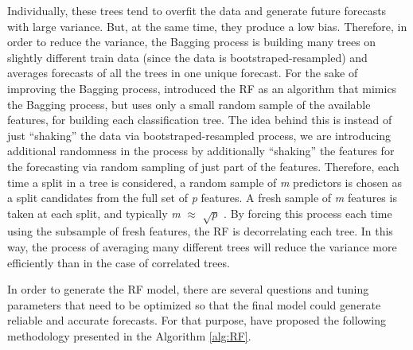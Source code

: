 \documentclass[preprint, 3p,
authoryear]{elsarticle} %
\begin{document}
Individually, these trees tend to overfit the data and generate future
forecasts with large variance. But, at the same time, they produce a low
bias. Therefore, in order to reduce the variance, the Bagging process is
building many trees on slightly different train data (since the data is
bootstraped-resampled) and averages forecasts of all the trees in one
unique forecast. For the sake of improving the Bagging process,
\citet{breiman2001random} introduced the RF as an algorithm that mimics
the Bagging process, but uses only a small random sample of the
available features, for building each classification tree. The idea
behind this is instead of just ``shaking'' the data via
bootstraped-resampled process, we are introducing additional randomness
in the process by additionally ``shaking'' the features for the
forecasting via random sampling of just part of the features. Therefore,
each time a split in a tree is considered, a random sample of \emph{m}
predictors is chosen as a split candidates from the full set of \emph{p}
features. A fresh sample of \emph{m} features is taken at each split,
and typically \emph{m} \(\approx\) \(\sqrt p\)
\citep{friedman2001elements}. By forcing this process each time using
the subsample of fresh features, the RF is decorrelating each tree. In
this way, the process of averaging many different trees will reduce the
variance more efficiently than in the case of correlated trees.

In order to generate the RF model, there are several questions and
tuning parameters that need to be optimized so that the final model
could generate reliable and accurate forecasts. For that purpose,
\citet{friedman2001elements} have proposed the following methodology
presented in the Algorithm \ref{alg:RF}.
\end{document}
